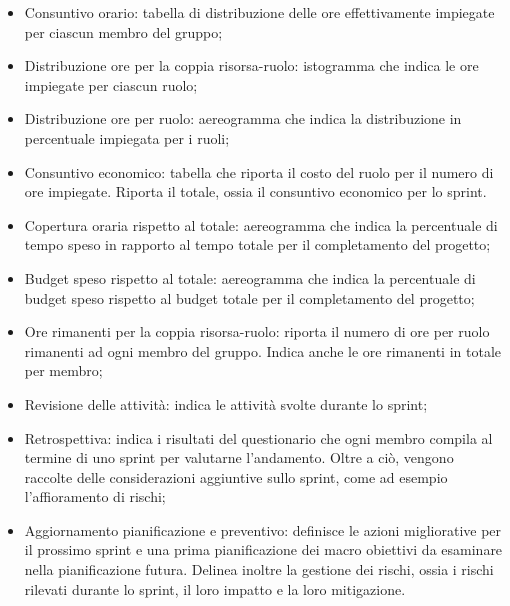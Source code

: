 \begin{enumerate}
  \begin{itemize}
    \item Consuntivo orario: tabella di distribuzione delle ore effettivamente impiegate per ciascun membro del gruppo;
    \item Distribuzione ore per la coppia risorsa-ruolo: istogramma che indica le ore impiegate per ciascun ruolo;
    \item Distribuzione ore per ruolo: aereogramma che indica la distribuzione in percentuale impiegata per i ruoli;
    \item Consuntivo economico: tabella che riporta il costo del ruolo per il numero di ore impiegate. Riporta il totale, ossia il consuntivo economico per lo sprint.
    \item Copertura oraria rispetto al totale: aereogramma che indica la percentuale di tempo speso in rapporto al tempo totale per il completamento del progetto;
    \item Budget speso rispetto al totale: aereogramma che indica la percentuale di budget speso rispetto al budget totale per il completamento del progetto;
    \item Ore rimanenti per la coppia risorsa-ruolo: riporta il numero di ore per ruolo rimanenti ad ogni membro del gruppo. Indica anche le ore rimanenti in totale per membro;
    \item Revisione delle attività: indica le attività svolte durante lo sprint;
    \item Retrospettiva: indica i risultati del questionario che ogni membro compila al termine di uno sprint per valutarne l'andamento. Oltre a ciò, vengono raccolte delle considerazioni aggiuntive sullo sprint, come ad esempio l'affioramento di rischi;
    \item Aggiornamento pianificazione e preventivo: definisce le azioni migliorative per il prossimo sprint e una prima pianificazione dei macro obiettivi da esaminare nella pianificazione futura. Delinea inoltre la gestione dei rischi, ossia i rischi rilevati durante lo sprint, il loro impatto e la loro mitigazione.
  \end{itemize}
\end{enumerate}

